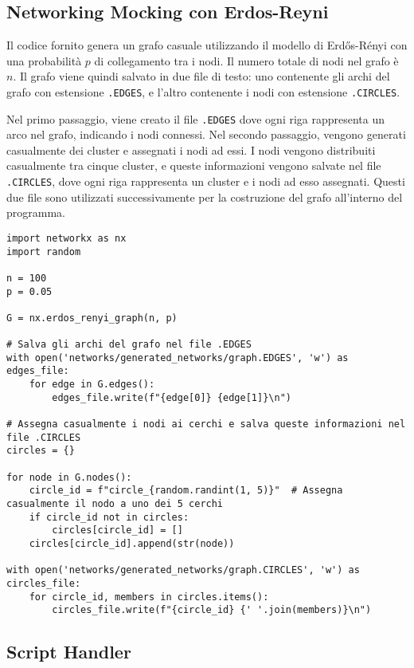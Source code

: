 \subsection{Networking Mocking con Erdos-Reyni}

Il codice fornito genera un grafo casuale utilizzando il modello di Erdős-Rényi con una probabilità $ p $ di collegamento tra i nodi. Il numero totale di nodi nel grafo è $ n $. Il grafo viene quindi salvato in due file di testo: uno contenente gli archi del grafo con estensione \texttt{.EDGES}, e l'altro contenente i nodi con estensione \texttt{.CIRCLES}.

Nel primo passaggio, viene creato il file \texttt{.EDGES} dove ogni riga rappresenta un arco nel grafo, indicando i nodi connessi. Nel secondo passaggio, vengono generati casualmente dei cluster e assegnati i nodi ad essi. I nodi vengono distribuiti casualmente tra cinque cluster, e queste informazioni vengono salvate nel file \texttt{.CIRCLES}, dove ogni riga rappresenta un cluster e i nodi ad esso assegnati. Questi due file sono utilizzati successivamente per la costruzione del grafo all'interno del programma.

\begin{code}
\begin{verbatim}
import networkx as nx
import random

n = 100
p = 0.05

G = nx.erdos_renyi_graph(n, p)

# Salva gli archi del grafo nel file .EDGES
with open('networks/generated_networks/graph.EDGES', 'w') as edges_file:
    for edge in G.edges():
        edges_file.write(f"{edge[0]} {edge[1]}\n")

# Assegna casualmente i nodi ai cerchi e salva queste informazioni nel file .CIRCLES
circles = {}

for node in G.nodes():
    circle_id = f"circle_{random.randint(1, 5)}"  # Assegna casualmente il nodo a uno dei 5 cerchi
    if circle_id not in circles:
        circles[circle_id] = []
    circles[circle_id].append(str(node))

with open('networks/generated_networks/graph.CIRCLES', 'w') as circles_file:
    for circle_id, members in circles.items():
        circles_file.write(f"{circle_id} {' '.join(members)}\n")
\end{verbatim}
\end{code}

\subsection{Script Handler}

